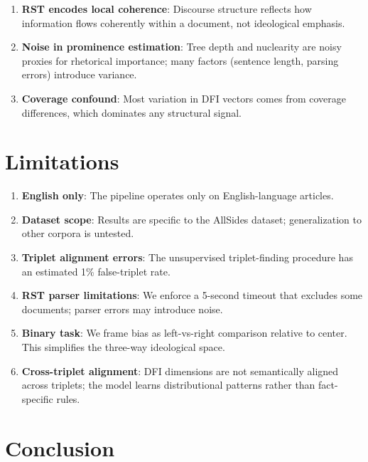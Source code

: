 \documentclass[11pt]{article}
\begin{document}
\begin{enumerate}
    \item \textbf{RST encodes local coherence}: Discourse structure reflects how information flows coherently within a document, not ideological emphasis.
    
    \item \textbf{Noise in prominence estimation}: Tree depth and nuclearity are noisy proxies for rhetorical importance; many factors (sentence length, parsing errors) introduce variance.
    
    \item \textbf{Coverage confound}: Most variation in DFI vectors comes from coverage differences, which dominates any structural signal.
\end{enumerate}


\section{Limitations}

\begin{enumerate}
    \item \textbf{English only}: The pipeline operates only on English-language articles.
    
    \item \textbf{Dataset scope}: Results are specific to the AllSides dataset; generalization to other corpora is untested.
    
    \item \textbf{Triplet alignment errors}: The unsupervised triplet-finding procedure has an estimated 1\% false-triplet rate.
    
    \item \textbf{RST parser limitations}: We enforce a 5-second timeout that excludes some documents; parser errors may introduce noise.
    
    \item \textbf{Binary task}: We frame bias as left-vs-right comparison relative to center. This simplifies the three-way ideological space.
    
    \item \textbf{Cross-triplet alignment}: DFI dimensions are not semantically aligned across triplets; the model learns distributional patterns rather than fact-specific rules.
\end{enumerate}


\section{Conclusion}
\end{document}
